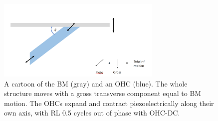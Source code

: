 \documentclass{article}
\begin{document}
\begin{figure}
	\centering
	\includegraphics[width=0.7\textwidth]{Figures/grosspiezo.png}
	\caption{A cartoon of the BM (gray) and an OHC (blue). The whole structure moves with a gross transverse component equal to BM motion. The OHCs expand and contract piezoelectrically along their own axis, with RL 0.5 cycles out of phase with OHC-DC.}
	\label{grosspiezo}
\end{figure}
\end{document}
